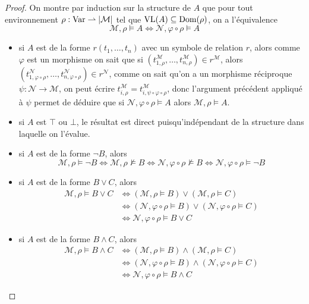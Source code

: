 \begin{proof}
  On montre par induction sur la structure de $A$ que pour tout environnement
  $\rho : \operatorname{Var}\rightharpoonup |\mathcal M|$ tel que $\operatorname{VL}(A) \subseteq\operatorname{Dom}(\rho)$,
  on a l'équivalence
  \[\mathcal M,\rho\models A \iff \mathcal N,\varphi\circ \rho\models A\]
  \begin{itemize}
  \item si $A$ est de la forme $r(t_1,\ldots,t_n)$ avec un symbole de relation
    $r$, alors comme $\varphi$ est un morphisme on sait que si
    $(t_{1,\rho}^\mathcal M,\ldots,t_{n,\rho}^\mathcal M)\in r^\mathcal M$, alors
    $(t_{1,\varphi\circ \rho}^\mathcal N,\ldots,
    t_{n,\varphi\circ\rho}^\mathcal N)\in r^{\mathcal N}$, comme on sait qu'on a
    un morphisme réciproque $\psi : \mathcal N \to \mathcal M$, on peut
    écrire $t_{i,\rho}^\mathcal M = t_{i,\psi\circ\varphi\circ\rho}^\mathcal M$, donc
    l'argument précédent appliqué à $\psi$ permet de déduire que si
    $\mathcal N,\varphi\circ \rho\models A$ alors $\mathcal M,\rho\models A$.
  \item si $A$ est $\top$ ou $\bot$, le résultat est direct puisqu'indépendant
    de la structure dans laquelle on l'évalue.
  \item si $A$ est de la forme $\lnot B$, alors
    \[\mathcal M, \rho\models \lnot B\iff \mathcal M, \rho\not\models B
    \iff \mathcal N,\varphi\circ\rho\not\models B
    \iff \mathcal N,\varphi\circ\rho\models \lnot B\]
  \item si $A$ est de la forme $B\lor C$, alors
    \begin{align*}
      \mathcal M, \rho \models B\lor C &\iff (\mathcal M,\rho\models B)\lor
      (\mathcal M,\rho\models C) \\
      &\iff (\mathcal N,\varphi\circ\rho\models B)\lor
      (\mathcal N,\varphi\circ\rho\models C)\\
      &\iff \mathcal N,\varphi\circ \rho \models B\lor C
      \end{align*}
  \item si $A$ est de la forme $B\land C$, alors
    \begin{align*}
      \mathcal M, \rho \models B\land C &\iff (\mathcal M,\rho\models B)\land
      (\mathcal M,\rho\models C) \\
      &\iff (\mathcal N,\varphi\circ\rho\models B)\land
      (\mathcal N,\varphi\circ\rho\models C)\\
      &\iff \mathcal N,\varphi\circ \rho \models B\land C
      \end{align*}

\end{itemize}
\end{proof}
